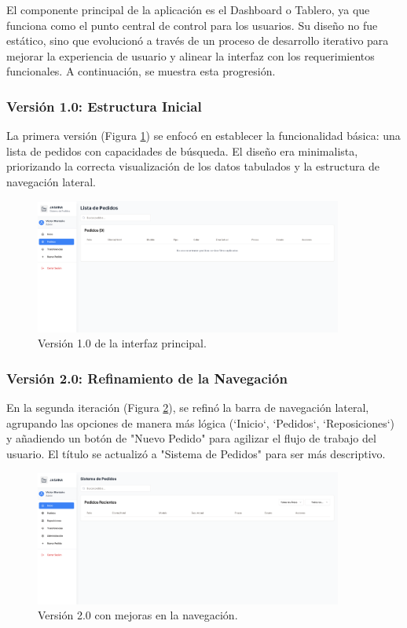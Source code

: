 \documentclass[12pt,letterpaper,spanish]{report}
\begin{document}
El componente principal de la aplicación es el Dashboard o Tablero, ya que funciona como el punto central de control para los usuarios. Su diseño no fue estático, sino que evolucionó a través de un proceso de desarrollo iterativo para mejorar la experiencia de usuario y alinear la interfaz con los requerimientos funcionales. A continuación, se muestra esta progresión.

\subsubsection{Versión 1.0: Estructura Inicial}
La primera versión (Figura \ref{fig:v1}) se enfocó en establecer la funcionalidad básica: una lista de pedidos con capacidades de búsqueda. El diseño era minimalista, priorizando la correcta visualización de los datos tabulados y la estructura de navegación lateral.

\begin{figure}[H]
    \centering
    \includegraphics[width=0.9\textwidth]{V1.0.png}
    \caption{Versión 1.0 de la interfaz principal.}
    \label{fig:v1}
\end{figure}

\subsubsection{Versión 2.0: Refinamiento de la Navegación}
En la segunda iteración (Figura \ref{fig:v2}), se refinó la barra de navegación lateral, agrupando las opciones de manera más lógica (`Inicio`, `Pedidos`, `Reposiciones`) y añadiendo un botón de "Nuevo Pedido" para agilizar el flujo de trabajo del usuario. El título se actualizó a "Sistema de Pedidos" para ser más descriptivo.

\begin{figure}[H]
    \centering
    \includegraphics[width=0.9\textwidth]{V2.0.png}
    \caption{Versión 2.0 con mejoras en la navegación.}
    \label{fig:v2}
\end{figure}
\end{document}
